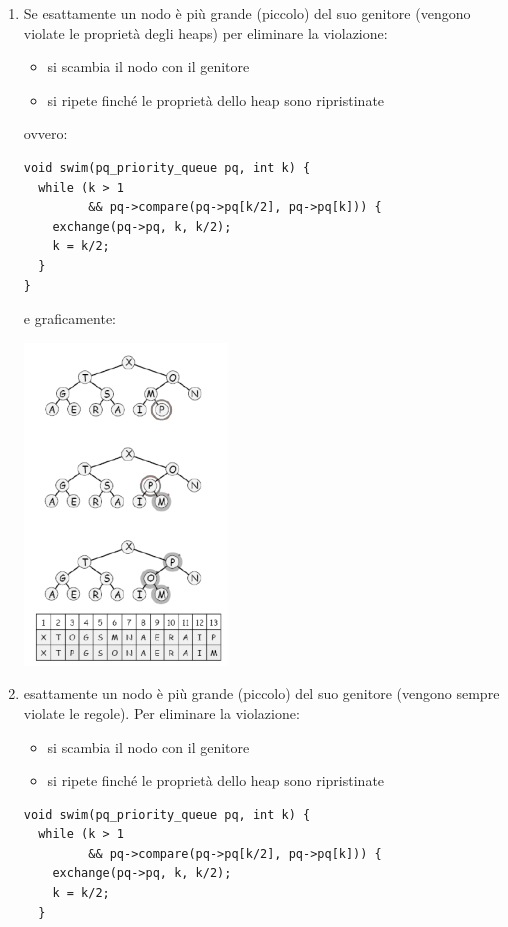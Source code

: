 \documentclass[a4paper,12pt, oneside]{book}
\begin{document}
\begin{enumerate}
	\item
	      Se esattamente un nodo è più grande (piccolo) del suo genitore (vengono violate le proprietà degli heaps) per eliminare la violazione:
	      \begin{itemize}
		      \item si scambia il nodo con il genitore
		      \item si ripete finché le proprietà dello heap sono ripristinate
	      \end{itemize}
	      ovvero:
	      \begin{verbatim}
void swim(pq_priority_queue pq, int k) {
  while (k > 1
         && pq->compare(pq->pq[k/2], pq->pq[k])) {
    exchange(pq->pq, k, k/2);
    k = k/2;
  }
}
\end{verbatim}
	      \newpage
	      e graficamente:
	      \begin{center}
		      \includegraphics[scale=4]{img/c9.png}
	      \end{center}
	\item
	      esattamente un nodo è più grande (piccolo) del suo genitore (vengono sempre violate le regole). Per eliminare la violazione:
	      \begin{itemize}
		      \item si scambia il nodo con il genitore
		      \item si ripete finché le proprietà dello heap sono ripristinate
	      \end{itemize}
	      \begin{verbatim}
void swim(pq_priority_queue pq, int k) {
  while (k > 1
         && pq->compare(pq->pq[k/2], pq->pq[k])) {
    exchange(pq->pq, k, k/2);
    k = k/2;
  }

\end{verbatim}
\end{enumerate}
\end{document}
